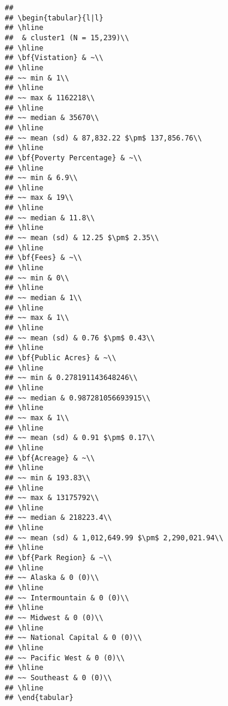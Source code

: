 \documentclass[
]{article}
\begin{document}
\begin{verbatim}
## 
## \begin{tabular}{l|l}
## \hline
##  & cluster1 (N = 15,239)\\
## \hline
## \bf{Vistation} & ~\\
## \hline
## ~~ min & 1\\
## \hline
## ~~ max & 1162218\\
## \hline
## ~~ median & 35670\\
## \hline
## ~~ mean (sd) & 87,832.22 $\pm$ 137,856.76\\
## \hline
## \bf{Poverty Percentage} & ~\\
## \hline
## ~~ min & 6.9\\
## \hline
## ~~ max & 19\\
## \hline
## ~~ median & 11.8\\
## \hline
## ~~ mean (sd) & 12.25 $\pm$ 2.35\\
## \hline
## \bf{Fees} & ~\\
## \hline
## ~~ min & 0\\
## \hline
## ~~ median & 1\\
## \hline
## ~~ max & 1\\
## \hline
## ~~ mean (sd) & 0.76 $\pm$ 0.43\\
## \hline
## \bf{Public Acres} & ~\\
## \hline
## ~~ min & 0.278191143648246\\
## \hline
## ~~ median & 0.987281056693915\\
## \hline
## ~~ max & 1\\
## \hline
## ~~ mean (sd) & 0.91 $\pm$ 0.17\\
## \hline
## \bf{Acreage} & ~\\
## \hline
## ~~ min & 193.83\\
## \hline
## ~~ max & 13175792\\
## \hline
## ~~ median & 218223.4\\
## \hline
## ~~ mean (sd) & 1,012,649.99 $\pm$ 2,290,021.94\\
## \hline
## \bf{Park Region} & ~\\
## \hline
## ~~ Alaska & 0 (0)\\
## \hline
## ~~ Intermountain & 0 (0)\\
## \hline
## ~~ Midwest & 0 (0)\\
## \hline
## ~~ National Capital & 0 (0)\\
## \hline
## ~~ Pacific West & 0 (0)\\
## \hline
## ~~ Southeast & 0 (0)\\
## \hline
## \end{tabular}
\end{verbatim}
\end{document}
